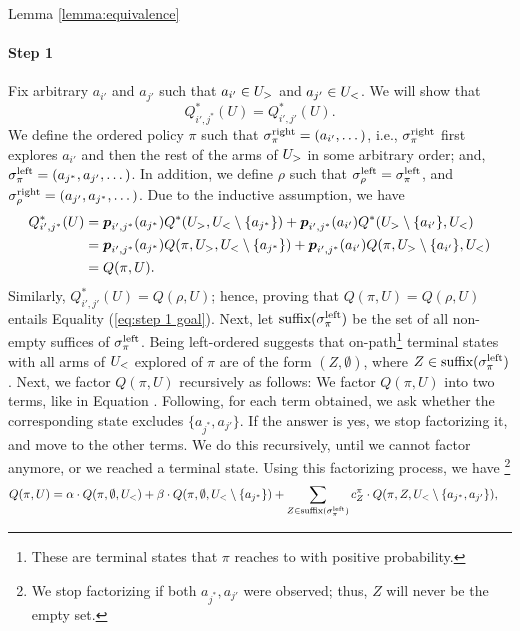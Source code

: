 \begin{proofof}{Lemma \ref{lemma:equivalence}}
\paragraph{Step 1} Fix arbitrary $a_{i'}$ and $a_{j'}$ such that  $a_{i'} \in U_>$ and $a_{j'} \in U_<$. We will show that 
\begin{equation}\label{eq:step 1 goal}
Q^*_{{i'},{j^*}}(U)=Q^*_{{i'},{j'}}(U).
\end{equation}
We define the ordered policy $\pi$ such that $\sigma^{\textnormal{right}}_\pi=(a_{i'},\dots)$, i.e., $\sigma^{\textnormal{right}}_\pi$ first explores $a_{i'}$ and then the rest of the arms of $U_>$ in some arbitrary order; and, $\sigma^{\textnormal{left}}_\pi=(a_{j^*},a_{j'},\dots)$. In addition, we define $\rho$ such that $\sigma^{\textnormal{left}}_{\rho}=\sigma^{\textnormal{left}}_\pi$, and $\sigma^{\textnormal{right}}_\rho=(a_{j'},a_{j^*},\dots)$. Due to the inductive assumption, we have 
\begin{align}\label{eq:policies suffice}
Q^*_{{i'},{j^*}}(U) &=  \boldsymbol{ p }_{{i'},{j^*}}(a_{j^*})Q^*(U_>,U_<\setminus \{a_{j^*}\}) +\boldsymbol{ p }_{{i'},{j^*}}(a_{i'})Q^*(U_>\setminus \{a_{i'}\},U_<) \nonumber \\
&= \boldsymbol{ p }_{{i'},{j^*}}(a_{j^*})Q(\pi,U_>,U_<\setminus \{a_{j^*}\})+\boldsymbol{ p }_{{i'},{j^*}}(a_{i'})Q(\pi,U_>\setminus \{a_{i'}\},U_<)\\
&=Q(\pi,U).\nonumber
\end{align}
Similarly, $Q^*_{{i'},{j'}}(U)  = Q(\rho,U)$; hence, proving that $Q(\pi,U) =Q(\rho,U)$ entails Equality (\ref{eq:step 1 goal}). Next, let $\textnormal{suffix}(\sigma^{\textnormal{left}}_\pi)$ be the set of all non-empty suffices of $\sigma^{\textnormal{left}}_\pi$. Being left-ordered suggests that on-path\footnote{These are terminal states that $\pi$ reaches to with positive probability.} terminal states with all arms of $U_<$ explored of $\pi$ are of the form $(Z,\emptyset)$, where $Z\in \textnormal{suffix}(\sigma^{\textnormal{left}}_\pi)$. Next, we factor $Q(\pi,U)$ recursively as follows: We factor $Q(\pi,U)$ into two terms, like in Equation . Following, for each term obtained, we ask whether the corresponding state excludes $\{a_{j^*},a_{j'}\}$. If the answer is yes, we stop factorizing it, and move to the other terms. We do this recursively, until we cannot factor anymore, or we reached a terminal state. Using this factorizing process, we have \footnote{We stop factorizing if both $a_{j^*},a_{j'}$ were observed; thus, $Z$ will never be the empty set.} 
\begin{align*}
Q(\pi,U) &= \alpha \cdot Q(\pi,\emptyset,\ul)+\beta\cdot Q(\pi,\emptyset,\ul\setminus \{a_{j^*} \}) + \sum_{Z \in \suff(\sigl_\pi)} c^\pi_Z \cdot Q(\pi,Z,\ul\setminus \{a_{j^*},a_{j'}\}),

\end{align*}
\end{proofof}
